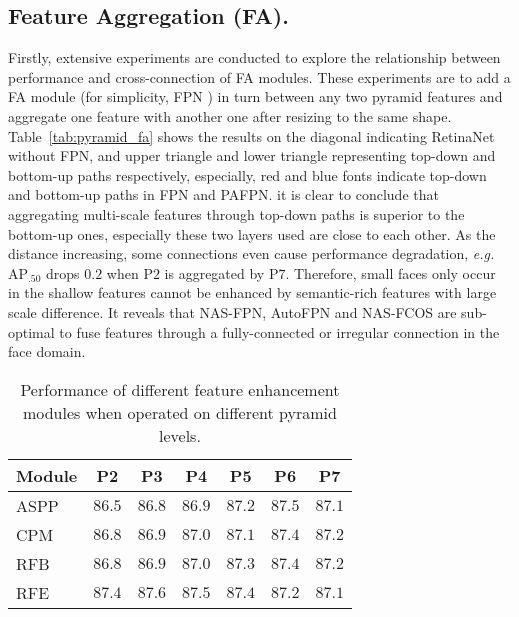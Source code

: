 \documentclass[sigconf]{acmart}
\begin{document}
\subsection{Feature Aggregation (FA).}
Firstly, extensive experiments are conducted to explore the relationship between performance and cross-connection of FA modules. These experiments are to add a FA module (for simplicity, FPN \cite{lin2017fpn}) in turn between any two pyramid features and aggregate one feature with another one after resizing to the same shape. Table~\ref{tab:pyramid_fa} shows the results on the diagonal indicating RetinaNet without FPN, and upper triangle and lower triangle representing top-down and bottom-up paths respectively, especially, red and blue fonts indicate top-down and bottom-up paths in FPN and PAFPN. it is clear to conclude that aggregating multi-scale features through top-down paths is superior to the bottom-up ones, especially these two layers used are close to each other. As the distance increasing, some connections even cause performance degradation, \textit{e.g.} AP$_{.50}$ drops $0.2$ when P$2$ is aggregated by P$7$.
Therefore, small faces only occur in the shallow features cannot be enhanced by semantic-rich features with large scale difference.
It reveals that NAS-FPN, AutoFPN and NAS-FCOS are sub-optimal to fuse features through a fully-connected or irregular connection in the face domain. 


 
\begin{table}[!t]
    \centering
    \begin{tabular}{l|cccccc}
        \toprule[1pt]
        Module & P2 & P3 & P4 & P5 & P6 & P7 \\
        \midrule[0.5pt]
        ASPP & $86.5$ & $86.8$ & $86.9$ & $87.2$ & $\mathbf{87.5}$ & $87.1$ \\
        CPM & $86.8$ & $86.9$ & $87.0$ & $87.1$ & $\mathbf{87.4}$ & $87.2$ \\
        RFB & $86.8$ & $86.9$ & $87.0$ & $87.3$ & $\mathbf{87.4}$ & $87.2$ \\
        RFE & $87.4$ & $\mathbf{87.6}$ & $87.5$ & $87.4$ & $87.2$ & $87.1$ \\
        \bottomrule[1pt]
    \end{tabular}
\caption{Performance of different feature enhancement modules when operated on different pyramid levels.}
    \label{tab:pyramid_fe}
\end{table}
\end{document}
